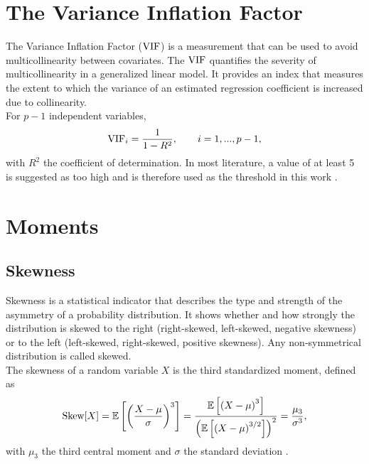 \section{The Variance Inflation Factor}\label{sec:vif}
The Variance Inflation Factor ($\hbox{VIF}$) is a measurement that can be used to avoid multicollinearity between covariates. The $\hbox{VIF}$ quantifies the severity of multicollinearity in a generalized linear model. It provides an index that measures the extent to which the variance of an estimated regression coefficient is increased due to collinearity. \\
For $p-1$ independent variables, 
\begin{equation}
    \hbox{VIF}_i = \frac{1}{1-R^2},\hspace{20pt}i=1,...,p-1,
\end{equation}
with $R^2$ the coefficient of determination. In most literature, a value of at least 5 is suggested as too high and is therefore used as the threshold in this work \autocite[][]{craney2002model}.
\clearpage
\section{Moments}
\subsection{Skewness}
Skewness is a statistical indicator that describes the type and strength of the asymmetry of a probability distribution. It shows whether and how strongly the distribution is skewed to the right (right-skewed, left-skewed, negative skewness) or to the left (left-skewed, right-skewed, positive skewness). Any non-symmetrical distribution is called skewed. \\
The skewness of a random variable $X$ is the third standardized moment, defined as
\begin{equation}\label{eq:skewness}
    \hbox{Skew}[X]=\mathbb{E}\left[\left(\frac{X-\mu}{\sigma}\right)^3\right] = \frac{\mathbb{E}\left[\left(X-\mu\right)^3\right]}{\left(\mathbb{E}\left[\left(X-\mu\right)^{3/2}\right]\right)^2}=\frac{\mu_3}{\sigma^3},
\end{equation}
with $\mu_3$ the third central moment and $\sigma$ the standard deviation \autocite[][]{doane2011measuring, wilkins1944note}.
